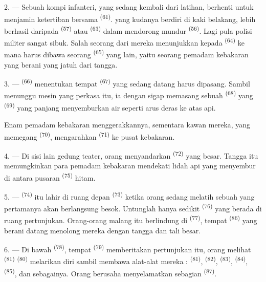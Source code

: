 2. --- Sebuah kompi infanteri, yang sedang kembali dari latihan,
berhenti untuk menjamin ketertiban bersama  \textsuperscript{(61)}.  yang kudanya
berdiri di kaki belakang, lebih berhasil daripada  \textsuperscript{(57)} atau 
\textsuperscript{(63)} dalam mendorong mundur  \textsuperscript{(56)}. Lagi pula polisi militer sangat
sibuk. Salah seorang dari mereka menunjukkan kepada 
\textsuperscript{(64)} ke mana harus dibawa seorang  \textsuperscript{(65)} yang lain, yaitu seorang pemadam
kebakaran yang berani yang jatuh dari tangga.

3. ---  \textsuperscript{(66)} menentukan tempat
 \textsuperscript{(67)} yang sedang datang harus
dipasang. Sambil menunggu mesin yang perkasa itu, ia dengan sigap
memasang sebuah  \textsuperscript{(68)} yang
 \textsuperscript{(69)} yang panjang menyemburkan air
seperti arus deras ke atas api.

Enam pemadam kebakaran menggerakkannya, sementara kawan mereka, yang
memegang  \textsuperscript{(70)}, mengarahkan
 \textsuperscript{(71)} ke pusat kebakaran.

4. --- Di sisi lain gedung teater, orang menyandarkan 
\textsuperscript{(72)} yang besar. Tangga itu memungkinkan para pemadam
kebakaran mendekati lidah api yang menyembur di antara pusaran
 \textsuperscript{(75)} hitam.

\VUsaut{5.0mm}
\VUsaut{3.4mm}

5. ---  \textsuperscript{(74)} itu lahir di ruang
depan  \textsuperscript{(73)} ketika orang sedang
melatih sebuah  yang  pertamanya akan
berlangsung besok. Untunglah hanya sedikit 
\textsuperscript{(76)} yang berada di ruang pertunjukan. Orang-orang
malang itu berlindung di  \textsuperscript{(77)}, tempat
 \textsuperscript{(86)} yang berani
datang menolong mereka dengan tangga dan tali besar.

6. --- Di bawah  \textsuperscript{(78)},
tempat  \textsuperscript{(79)} memberitakan pertunjukan
itu, orang melihat  \textsuperscript{(81)}
 \textsuperscript{(80)} melarikan diri sambil membawa
alat-alat mereka :  \textsuperscript{(81)},
 \textsuperscript{(82)}, 
\textsuperscript{(83)},  \textsuperscript{(84)},
 \textsuperscript{(85)}, dan sebagainya. Orang berusaha
menyelamatkan sebagian  \textsuperscript{(87)}.


